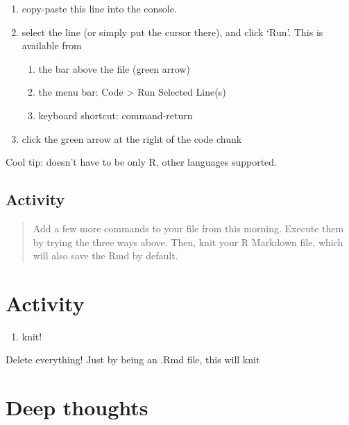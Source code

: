 \documentclass[]{book}
\providecommand{\tightlist}{%
  \setlength{\itemsep}{0pt}\setlength{\parskip}{0pt}}
\begin{document}
\begin{enumerate}
\def\labelenumi{\arabic{enumi}.}
\tightlist
\item
  copy-paste this line into the console.
\item
  select the line (or simply put the cursor there), and click `Run'. This is available from

  \begin{enumerate}
  \def\labelenumii{\alph{enumii}.}
  \tightlist
  \item
    the bar above the file (green arrow)
  \item
    the menu bar: Code \textgreater{} Run Selected Line(s)
  \item
    keyboard shortcut: command-return
  \end{enumerate}
\item
  click the green arrow at the right of the code chunk
\end{enumerate}

Cool tip: doesn't have to be only R, other languages supported.

\hypertarget{activity-3}{%
\subsection{Activity}\label{activity-3}}

\begin{quote}
Add a few more commands to your file from this morning. Execute them by trying the three ways above. Then, knit your R Markdown file, which will also save the Rmd by default.
\end{quote}

\hypertarget{activity-4}{%
\section{Activity}\label{activity-4}}

\begin{enumerate}
\def\labelenumi{\arabic{enumi}.}
\tightlist
\item
  knit!
\end{enumerate}

Delete everything! Just by being an .Rmd file, this will knit

\hypertarget{deep-thoughts}{%
\section{Deep thoughts}\label{deep-thoughts}}
\end{document}
